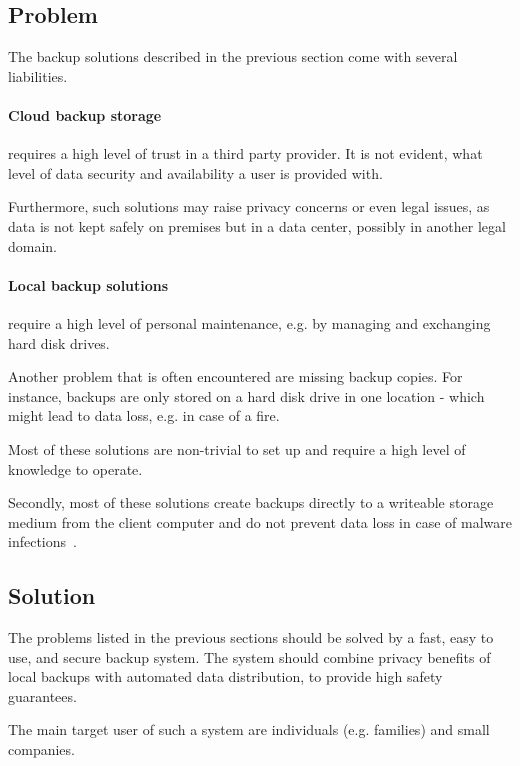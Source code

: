 \subsection{Problem}
The backup solutions described in the previous section come with several liabilities.

\paragraph{Cloud backup storage} requires a high level of trust in a third party provider. It is not evident, what level of data security and availability a user is provided with.

Furthermore, such solutions may raise privacy concerns or even legal issues, as data is not kept safely on premises but in a data center, possibly in another legal domain.

\paragraph{Local backup solutions} require a high level of personal maintenance, e.g. by managing and exchanging hard disk drives.

Another problem that is often encountered are missing backup copies. For instance, backups are only stored on a hard disk drive in one location - which might lead to data loss, e.g. in case of a fire.

Most of these solutions are non-trivial to set up and require a high level of knowledge to operate.

Secondly, most of these solutions create backups directly to a writeable storage medium from the client computer and do not prevent data loss in case of malware infections~\cite{young-cryptovirology}.

\subsection{Solution}

The problems listed in the previous sections should be solved by a fast, easy to use, and secure backup system. The system should combine privacy benefits of local backups with automated data distribution, to provide high safety guarantees.

The main target user of such a system are individuals (e.g. families) and small companies.

